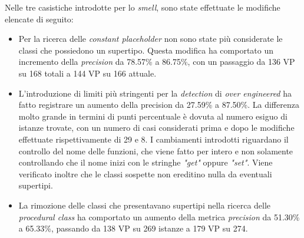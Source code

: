     Nelle tre casistiche introdotte per lo \textit{smell}, sono state effettuate le modifiche elencate di seguito:
    \begin{itemize}
        \item Per la ricerca delle \textit{constant placeholder} non sono state più considerate le classi che possiedono un supertipo. Questa modifica ha comportato un incremento della \textit{precision} da 78.57\% a 86.75\%, con un passaggio da 136 VP su 168 totali a 144 VP su 166 attuale.
         
        \item L'introduzione di limiti più stringenti per la \textit{detection} di \textit{over engineered} ha fatto registrare un aumento della precision da 27.59\% a 87.50\%. La differenza molto grande in termini di punti percentuale è dovuta al numero esiguo di istanze trovate, con un numero di casi considerati prima e dopo le modifiche effettuate rispettivamente di 29 e 8. I cambiamenti introdotti riguardano il controllo del nome delle funzioni, che viene fatto per intero e non solamente controllando che il nome inizi con le stringhe \textit{"get"} oppure \textit{"set"}. Viene verificato inoltre che le classi sospette non ereditino nulla da eventuali supertipi. 
        
        
        \item La rimozione delle classi che presentavano supertipi nella ricerca delle \textit{procedural class} ha comportato un aumento della metrica \textit{precision} da 51.30\% a 65.33\%, passando da 138 VP su 269 istanze a 179 VP su 274. 
    \end{itemize}
